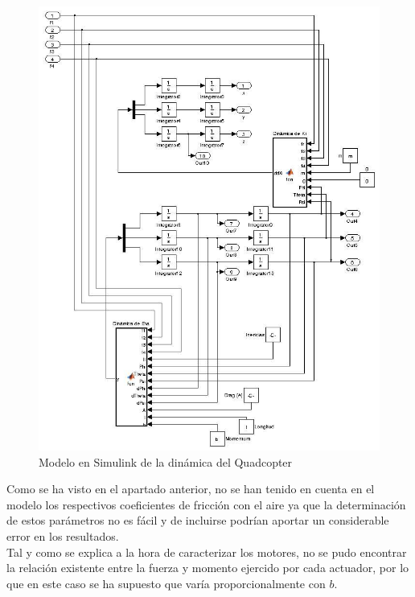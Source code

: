 \documentclass[twoside,11pt]{book}
\begin{document}
\begin{figure}[h!]
\begin{center}
\hspace{0cm} \includegraphics[scale=0.6,bb=0 0 620 750]{images/Simulink_model.png}
\caption{Modelo en Simulink de la dinámica del Quadcopter}
\end{center}
\end{figure}

Como se ha visto en el apartado anterior, no se han tenido en cuenta en el modelo los respectivos coeficientes de fricción con el aire ya que la determinación de estos parámetros no es fácil y de incluirse podrían aportar un considerable error en los resultados. \\

Tal y como se explica a la hora de caracterizar los motores, no se pudo encontrar la relación existente entre la fuerza y momento ejercido por cada actuador, por lo que en este caso se ha supuesto que varía proporcionalmente con $b$.
\end{document}
